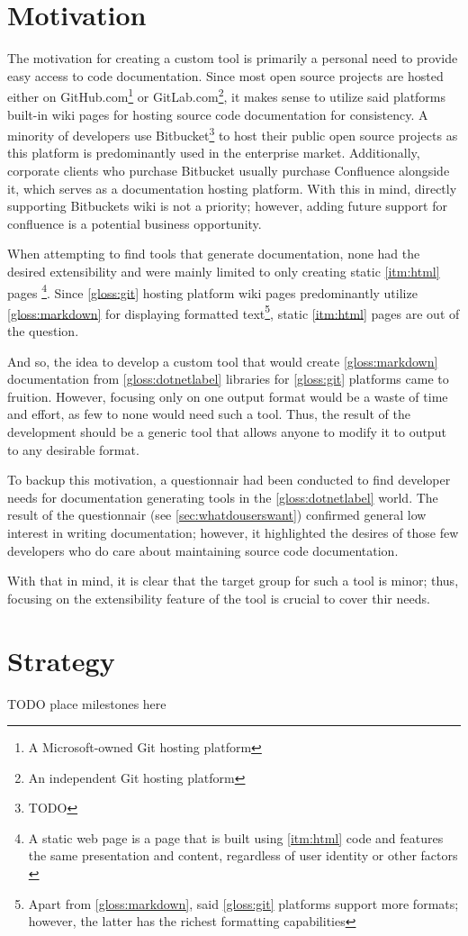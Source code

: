 \section*{Motivation}

The motivation for creating a custom tool is primarily a personal need to provide easy access to code documentation. Since most open source projects are hosted either on GitHub.com\footnote{A Microsoft-owned Git hosting platform} or GitLab.com\footnote{An independent Git hosting platform}, it makes sense to utilize said platforms built-in wiki pages for hosting source code documentation for consistency. A minority of developers use Bitbucket\footnote{TODO} to host their public open source projects as this platform is predominantly used in the enterprise market. Additionally, corporate clients who purchase Bitbucket usually purchase Confluence alongside it, which serves as a documentation hosting platform. With this in mind, directly supporting Bitbuckets wiki is not a priority; however, adding future support for confluence is a potential business opportunity.

When attempting to find tools that generate documentation, none had the desired extensibility and were mainly limited to only creating static \ref{itm:html} pages
\footnote{A static web page is a page that is built using \ref{itm:html} code and features the same presentation and content, regardless of user identity or other factors \cite{techopedia_what_2017}}.
Since \ref{gloss:git} hosting platform wiki pages predominantly utilize \ref{gloss:markdown} for displaying formatted text\footnote{Apart from \ref{gloss:markdown}, said \ref{gloss:git} platforms support more formats; however, the latter has the richest formatting capabilities}, static \ref{itm:html} pages are out of the question.

And so, the idea to develop a custom tool that would create \ref{gloss:markdown} documentation from \ref{gloss:dotnetlabel} libraries for \ref{gloss:git} platforms came to fruition. However, focusing only on one output format would be a waste of time and effort, as few to none would need such a tool. Thus, the result of the development should be a generic tool that allows anyone to modify it to output to any desirable format.

To backup this motivation, a questionnair had been conducted to find developer needs for documentation generating tools in the \ref{gloss:dotnetlabel} world. The result of the questionnair (see \ref{sec:whatdouserswant}) confirmed general low interest in writing documentation; however, it highlighted the desires of those few developers who do care about maintaining source code documentation.

With that in mind, it is clear that the target group for such a tool is minor; thus, focusing on the extensibility feature of the tool is crucial to cover thir needs.

\section*{Strategy}

TODO place milestones here
